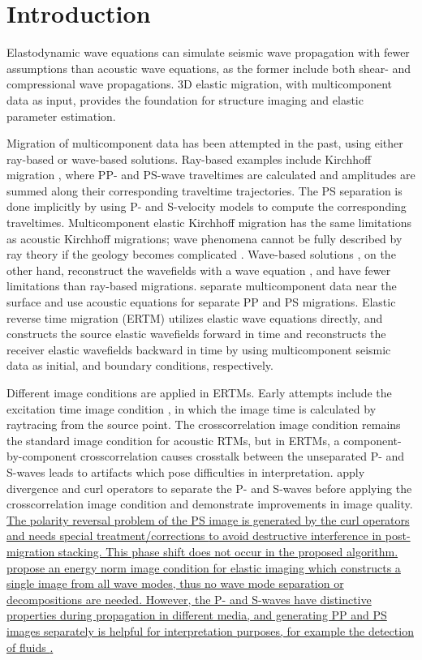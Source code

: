 \documentclass[manuscript,ulem,graphix,revised]{geophysics}
\begin{document}
\section{Introduction}

Elastodynamic wave equations can simulate seismic wave propagation with fewer assumptions than acoustic wave equations, as the former include both shear- and compressional wave propagations. 3D elastic migration, with multicomponent data as input, provides the foundation for structure imaging and elastic parameter estimation.

Migration of multicomponent data has been attempted in the past, using either ray-based or wave-based solutions. Ray-based examples include Kirchhoff migration \citep{kuo84, dai86, hokstad00}, where PP- and PS-wave traveltimes are calculated and amplitudes are summed along their corresponding traveltime trajectories. The PS separation is done implicitly by using P- and S-velocity models to compute the corresponding traveltimes. Multicomponent elastic Kirchhoff migration has the same limitations as acoustic Kirchhoff migrations; wave phenomena cannot be fully described by ray theory if the geology becomes complicated \citep{gray01}. Wave-based solutions \citep{chang86,chang94,whitmore95}, on the other hand, reconstruct the wavefields with a wave equation \citep{wapenaar90}, and have fewer limitations than ray-based migrations. \citet{sun01} separate multicomponent data near the surface and use acoustic equations for separate PP and PS migrations. Elastic reverse time migration (ERTM) utilizes elastic wave equations directly, and constructs the source elastic wavefields forward in time and reconstructs the receiver elastic wavefields backward in time by using multicomponent seismic data as initial, and boundary conditions, respectively.

Different image conditions are applied in ERTMs. Early attempts include the excitation time image condition \citep{chang86}, in which the image time is calculated by raytracing from the source point. The crosscorrelation image condition \citep{claerbout85} remains the standard image condition for acoustic RTMs, but in ERTMs, a component-by-component crosscorrelation causes crosstalk between the unseparated P- and S-waves leads to artifacts which pose difficulties in interpretation. \citet{yan08} apply divergence and curl operators to separate the P- and S-waves before applying the crosscorrelation image condition and demonstrate improvements in image quality. \marginpar{[10]} \uline{The polarity reversal problem of the PS image is generated by the curl operators and needs special treatment/corrections \mbox{\citep{du12,du14}} to avoid destructive interference in post-migration stacking. This phase shift does not occur in the proposed algorithm.} 
\marginpar{[2]}\uline{\mbox{\citet{rocha16}} propose an energy norm image condition for elastic imaging which constructs a single image from all wave modes, thus no wave mode separation or decompositions are needed. However, the P- and S-waves have distinctive properties during propagation in different media, and generating PP and PS images separately is helpful for interpretation purposes, for example the detection of fluids \mbox{\citep{stewart90}}.} 
\end{document}
